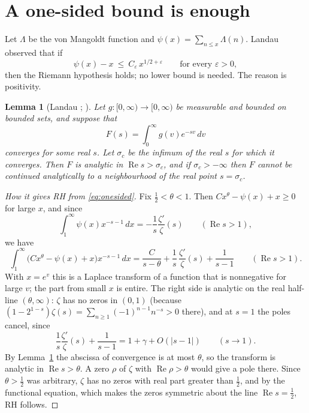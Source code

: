\documentclass[11pt]{amsart}
\numberwithin{equation}{section}
\newtheorem{lemma}[theorem]{Lemma}
\theoremstyle{definition}
\theoremstyle{remark}
\newcommand{\re}{\operatorname{Re}}
\begin{document}
\section{A one-sided bound is enough}\label{sec:landau}

Let $\Lambda$ be the von Mangoldt function and $\psi(x)=\sum_{n\le x}\Lambda(n)$. Landau observed that if
\begin{equation}\label{eq:onesided}
 \psi(x)-x\ \le\ C_\varepsilon\,x^{1/2+\varepsilon}\qquad\text{for every }\varepsilon>0,
\end{equation}
then the Riemann hypothesis holds; no lower bound is needed. The reason is positivity.

\begin{lemma}[Landau \cite{landau}; {\cite[Lemma~15.1]{MV}}]\label{lem:landau}
Let $g\colon[0,\infty)\to[0,\infty)$ be measurable and bounded on bounded sets, and suppose that
\begin{equation}
 F(s)=\int_0^\infty g(v)e^{-sv}\,dv
\end{equation}
converges for some real $s$. Let $\sigma_c$ be the infimum of the real $s$ for which it converges. Then $F$ is analytic in $\re s>\sigma_c$, and if $\sigma_c>-\infty$ then $F$ cannot be continued analytically to a neighbourhood of the real point $s=\sigma_c$.
\end{lemma}

\begin{proof}[How it gives RH from \eqref{eq:onesided}]
Fix $\frac12<\theta<1$. Then $Cx^{\theta}-\psi(x)+x\ge0$ for large $x$, and since
\begin{equation}
 \int_1^\infty\psi(x)x^{-s-1}\,dx=-\frac1s\frac{\zeta'}{\zeta}(s)\qquad(\re s>1),
\end{equation}
we have
\begin{equation}
 \int_1^\infty\bigl(Cx^\theta-\psi(x)+x\bigr)x^{-s-1}\,dx=\frac{C}{s-\theta}+\frac1{s}\,\frac{\zeta'}{\zeta}(s)+\frac{1}{s-1}\qquad(\re s>1).
\end{equation}
With $x=e^v$ this is a Laplace transform of a function that is nonnegative for large $v$; the part from small $x$ is entire. The right side is analytic on the real half-line $(\theta,\infty)$: $\zeta$ has no zeros in $(0,1)$ (because $(1-2^{1-s})\zeta(s)=\sum_{n\ge1}(-1)^{n-1}n^{-s}>0$ there), and at $s=1$ the poles cancel, since
\begin{equation}
 \frac1s\frac{\zeta'}{\zeta}(s)+\frac1{s-1}=1+\gamma+O(|s-1|)\qquad(s\to1).
\end{equation}
 By Lemma~\ref{lem:landau} the abscissa of convergence is at most $\theta$, so the transform is analytic in $\re s>\theta$. A zero $\rho$ of $\zeta$ with $\re\rho>\theta$ would give a pole there. Since $\theta>\frac12$ was arbitrary, $\zeta$ has no zeros with real part greater than $\frac12$, and by the functional equation, which makes the zeros symmetric about the line $\re s=\frac12$, RH follows.
\end{proof}
\end{document}
